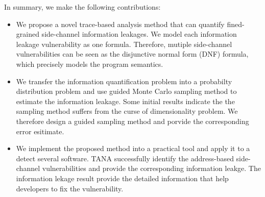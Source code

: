 In summary, we make the following contributions:

\begin{itemize}
	\item We propose a novel trace-based analysis method that can quantify fined-grained side-channel
        information leakages. We model each information leakage vulnerability as one formula. Therefore,
        mutiple side-channel vulnerabilities can be seen as the disjunctive normal form (DNF) formula, which
        precisely models the program semantics.
        \item We transfer the information quantification problem into a probabilty distribution problem and 
        use guided Monte Carlo sampling method to estimate the information leakage. Some initial results indicate the 
        the sampling method suffers from the curse of dimensionality problem. We therefore design a guided
        sampling method and porvide the corresponding error esitimate.
	\item We implement the proposed method into a practical tool and apply it to a detect several software. TANA 
        successfully identify the address-based side-channel vulnerabilities and provide the corresponding
        information leakge. The information lekage result provide the detailed information that help developers
        to fix the vulnerability.
\end{itemize}



